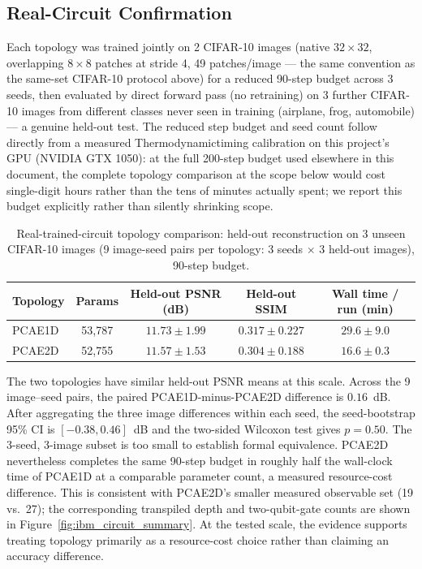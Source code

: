 \documentclass[11pt]{article}
\begin{document}
\subsection{Real-Circuit Confirmation}
\label{sec:topology_real_circuit}
Each topology was trained jointly on 2 CIFAR-10 images (native $32\times32$, overlapping $8\times8$ patches at stride 4, 49 patches/image --- the same convention as the same-set CIFAR-10 protocol above) for a reduced 90-step budget across 3 seeds, then evaluated by direct forward pass (no retraining) on 3 further CIFAR-10 images from different classes never seen in training (airplane, frog, automobile) --- a genuine held-out test. The reduced step budget and seed count follow directly from a measured Thermodynamictiming calibration on this project's GPU (NVIDIA GTX 1050): at the full 200-step budget used elsewhere in this document, the complete topology comparison at the scope below would cost single-digit hours rather than the tens of minutes actually spent; we report this budget explicitly rather than silently shrinking scope.

\begin{table}[H]
\centering
\caption{Real-trained-circuit topology comparison: held-out reconstruction on 3 unseen CIFAR-10 images (9 image-seed pairs per topology: 3 seeds $\times$ 3 held-out images), 90-step budget.}
\label{tab:topology_real_circuit}
\scriptsize
\begin{tabular}{lcccc}
\toprule
Topology & Params & Held-out PSNR (dB) & Held-out SSIM & Wall time / run (min) \\
\midrule
PCAE1D & 53{,}787 & $11.73\pm1.99$ & $0.317\pm0.227$ & $29.6\pm9.0$ \\
PCAE2D & 52{,}755 & $11.57\pm1.53$ & $0.304\pm0.188$ & $16.6\pm0.3$ \\
\bottomrule
\end{tabular}
\end{table}

The two topologies have similar held-out PSNR means at this scale. Across the 9 image--seed pairs, the paired PCAE1D-minus-PCAE2D difference is $0.16$~dB. After aggregating the three image differences within each seed, the seed-bootstrap 95\% CI is $[-0.38,0.46]$~dB and the two-sided Wilcoxon test gives $p=0.50$. The 3-seed, 3-image subset is too small to establish formal equivalence. PCAE2D nevertheless completes the same 90-step budget in roughly half the wall-clock time of PCAE1D at a comparable parameter count, a measured resource-cost difference. This is consistent with PCAE2D's smaller measured observable set (19 vs.\ 27); the corresponding transpiled depth and two-qubit-gate counts are shown in Figure~\ref{fig:ibm_circuit_summary}. At the tested scale, the evidence supports treating topology primarily as a resource-cost choice rather than claiming an accuracy difference.
\end{document}
